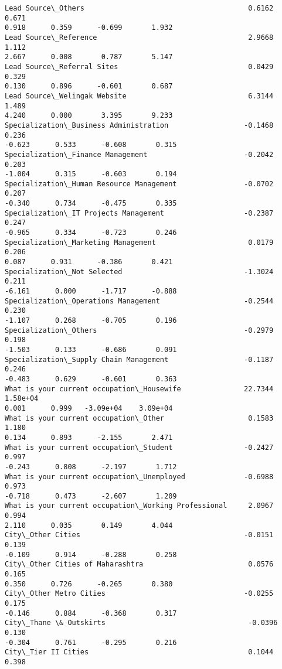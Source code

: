 \documentclass[11pt]{article}
\begin{document}
\begin{tcolorbox}[breakable, size=fbox, boxrule=.5pt, pad at break*=1mm, opacityfill=0]
\begin{Verbatim}[commandchars=\\\{\}]
Lead Source\_Others                                       0.6162      0.671
0.918      0.359      -0.699       1.932
Lead Source\_Reference                                    2.9668      1.112
2.667      0.008       0.787       5.147
Lead Source\_Referral Sites                               0.0429      0.329
0.130      0.896      -0.601       0.687
Lead Source\_Welingak Website                             6.3144      1.489
4.240      0.000       3.395       9.233
Specialization\_Business Administration                  -0.1468      0.236
-0.623      0.533      -0.608       0.315
Specialization\_Finance Management                       -0.2042      0.203
-1.004      0.315      -0.603       0.194
Specialization\_Human Resource Management                -0.0702      0.207
-0.340      0.734      -0.475       0.335
Specialization\_IT Projects Management                   -0.2387      0.247
-0.965      0.334      -0.723       0.246
Specialization\_Marketing Management                      0.0179      0.206
0.087      0.931      -0.386       0.421
Specialization\_Not Selected                             -1.3024      0.211
-6.161      0.000      -1.717      -0.888
Specialization\_Operations Management                    -0.2544      0.230
-1.107      0.268      -0.705       0.196
Specialization\_Others                                   -0.2979      0.198
-1.503      0.133      -0.686       0.091
Specialization\_Supply Chain Management                  -0.1187      0.246
-0.483      0.629      -0.601       0.363
What is your current occupation\_Housewife               22.7344   1.58e+04
0.001      0.999   -3.09e+04    3.09e+04
What is your current occupation\_Other                    0.1583      1.180
0.134      0.893      -2.155       2.471
What is your current occupation\_Student                 -0.2427      0.997
-0.243      0.808      -2.197       1.712
What is your current occupation\_Unemployed              -0.6988      0.973
-0.718      0.473      -2.607       1.209
What is your current occupation\_Working Professional     2.0967      0.994
2.110      0.035       0.149       4.044
City\_Other Cities                                       -0.0151      0.139
-0.109      0.914      -0.288       0.258
City\_Other Cities of Maharashtra                         0.0576      0.165
0.350      0.726      -0.265       0.380
City\_Other Metro Cities                                 -0.0255      0.175
-0.146      0.884      -0.368       0.317
City\_Thane \& Outskirts                                  -0.0396      0.130
-0.304      0.761      -0.295       0.216
City\_Tier II Cities                                      0.1044      0.398

\end{Verbatim}
\end{tcolorbox}
\end{document}
